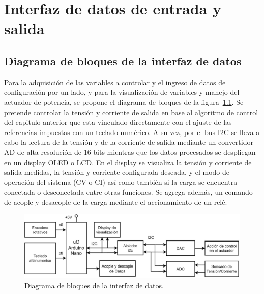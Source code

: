 \chapter{Interfaz de datos de entrada y salida}

\label{C:Interfaz de datos de entrada y salida}

\section{Diagrama de bloques de la interfaz de datos}
Para la adquisición de las variables a controlar y el ingreso de datos de configuración por un lado, y para la visualización de variables y manejo del actuador de potencia, se propone el diagrama de bloques de la figura~\ref{F:diagrama_digital}. Se pretende controlar la tensión y corriente de salida en base al algoritmo de control del capitulo anterior que esta vinculado directamente con el ajuste de las referencias impuestas con un teclado numérico. A su vez, por el bus I2C se lleva a cabo la lectura de la tensión y de la corriente de salida mediante un convertidor AD de alta resolución de 16 bits mientras que los datos procesados se despliegan en un display OLED o LCD. En el display se visualiza la tensión y corriente de salida medidas, la tensión y corriente configurada deseada, y el modo de operación del sistema (CV o CI) así como también si la carga se encuentra conectada o desconectada entre otras funciones. Se agrega además, un comando de acople y desacople de la carga mediante el accionamiento de un relé.

\begin{figure} [H]
    \centering
    \includegraphics[width=\textwidth]{./imagenes/diagrama_digital.jpg}
    \caption{Diagrama de bloques de la interfaz de datos.}
    \label{F:diagrama_digital}
\end{figure}

